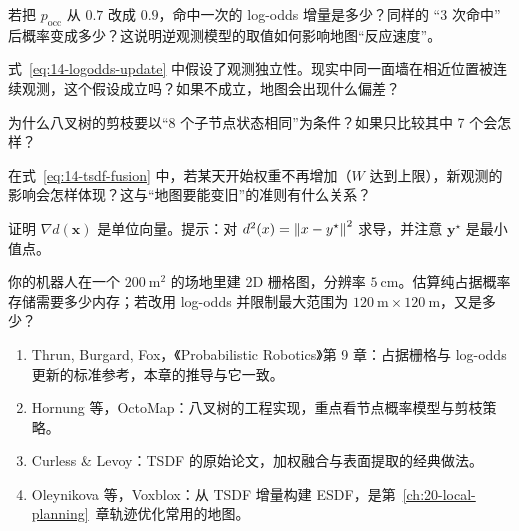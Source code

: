 \begin{problemset}
  \item 若把 $p_{\mathrm{occ}}$ 从 $0.7$ 改成 $0.9$，命中一次的 log-odds 增量是多少？同样的 ``3 次命中'' 后概率变成多少？这说明逆观测模型的取值如何影响地图``反应速度''。
  \item 式~\eqref{eq:14-logodds-update} 中假设了观测独立性。现实中同一面墙在相近位置被连续观测，这个假设成立吗？如果不成立，地图会出现什么偏差？
  \item 为什么八叉树的剪枝要以``8 个子节点状态相同''为条件？如果只比较其中 7 个会怎样？
  \item 在式~\eqref{eq:14-tsdf-fusion} 中，若某天开始权重不再增加（$W$ 达到上限），新观测的影响会怎样体现？这与``地图要能变旧''的准则有什么关系？
  \item 证明 $\nabla d(\bm{x})$ 是单位向量。提示：对 $d^{2}(x)=\left\lVert x-y^{\star} \right\rVert^{2}$ 求导，并注意 $\bm{y}^{\star}$ 是最小值点。
  \item 你的机器人在一个 $200\ \mathrm{m}^{2}$ 的场地里建 2D 栅格图，分辨率 $5\ \mathrm{cm}$。估算纯占据概率存储需要多少内存；若改用 log-odds 并限制最大范围为 $120\ \mathrm{m}\times120\ \mathrm{m}$，又是多少？
\end{problemset}

\begin{reading}
\begin{enumerate}
  \item Thrun, Burgard, Fox，《Probabilistic Robotics》第 9 章\cite{thrun2005probabilistic}：占据栅格与 log-odds 更新的标准参考，本章的推导与它一致。
  \item Hornung 等，OctoMap\cite{hornung2013octomap}：八叉树的工程实现，重点看节点概率模型与剪枝策略。
  \item Curless \& Levoy\cite{curless1996tsdf}：TSDF 的原始论文，加权融合与表面提取的经典做法。
  \item Oleynikova 等，Voxblox\cite{oleynikova2017voxblox}：从 TSDF 增量构建 ESDF，是第~\ref{ch:20-local-planning}~章轨迹优化常用的地图。
\end{enumerate}

\end{reading}
